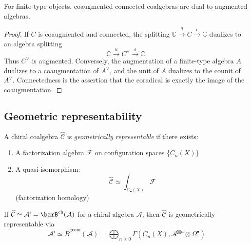 \begin{lemma}\label{lem:connectedness-augmentation}
For finite-type objects, coaugmented connected coalgebras are dual to
augmented algebras.
\end{lemma}

\begin{proof}
If $C$ is coaugmented and connected, the splitting
$\mathbb{C}\xrightarrow{\eta} C\xrightarrow{\epsilon}\mathbb{C}$
dualizes to an algebra splitting
\[
\mathbb{C}\xrightarrow{u} C^\vee\xrightarrow{\varepsilon}\mathbb{C}.
\]
Thus $C^\vee$ is augmented. Conversely, the augmentation of a
finite-type algebra $A$ dualizes to a coaugmentation of $A^\vee$, and
the unit of $A$ dualizes to the counit of $A^\vee$. Connectedness is
the assertion that the coradical is exactly the image of the
coaugmentation.
\end{proof}

\subsection{Geometric representability}

\begin{definition}\label{def:geom-representable-coalgebra}
A chiral coalgebra $\widehat{\mathcal{C}}$ is \emph{geometrically representable}
if there exists:
\begin{enumerate}
\item A factorization algebra $\mathcal{F}$ on configuration spaces $\{C_n(X)\}$
\item A quasi-isomorphism:
 \[\widehat{\mathcal{C}} \simeq \int_{C_\bullet(X)} \mathcal{F}\]
 (factorization homology)
\end{enumerate}
\end{definition}

\begin{theorem}\label{thm:koszul-geom-rep}
If
$\widehat{\mathcal{C}}\simeq
\mathcal{A}^{\mathrm i}=\barB^{\mathrm{ch}}(\mathcal{A})$
for a chiral algebra $\mathcal{A}$, then $\widehat{\mathcal{C}}$ is
geometrically representable via
\[\mathcal{A}^{\mathrm i} \simeq \bar{B}^{\text{geom}}(\mathcal{A}) =
\bigoplus_{n \geq 0} \Gamma\left(\overline{C}_n(X), \mathcal{A}^{\boxtimes n}
\otimes \Omega^\bullet\right)\]
\end{theorem}

